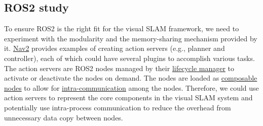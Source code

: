 \subsection{ROS2 study}

To ensure ROS2 is the right fit for the visual SLAM framework, we need to experiment with the modularity and the memory-sharing mechanism provided by it.
\href{https://github.com/ros-planning/navigation2}{Nav2} provides examples of creating action servers (e.g., planner and controller), each of which could have several plugins to accomplish various tasks.
The action servers are ROS2 nodes managed by their \href{https://github.com/ros2/demos/blob/humble/lifecycle/README.rst}{lifecycle manager} to activate or deactivate the nodes on demand.
The nodes are loaded as \href{https://docs.ros.org/en/humble/How-To-Guides/Launching-composable-nodes.html}{composable nodes} to allow for \href{https://docs.ros.org/en/humble/Tutorials/Demos/Intra-Process-Communication.html}{intra-communication} among the nodes.
Therefore, we could use action servers to represent the core components in the visual SLAM system and potentially use intra-process communication to reduce the overhead from unnecessary data copy between nodes.
